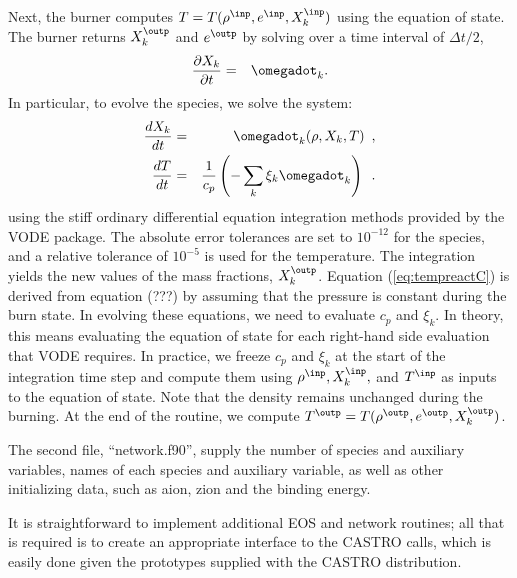 Next, the burner computes $T = T(\rho^\inp,e^\inp,X_k^\inp)$ using the equation of state.
The burner returns $X_k^\outp$ and $e^\outp$ by solving over a time interval of $\Delta t/2$,
\begin{eqnarray}
\frac{\partial X_k}{\partial t} &=& \omegadot_k.\\
\end{eqnarray}
In particular, to evolve the species, we solve the system:
\begin{eqnarray}
\frac{dX_k}{dt} &=& \omegadot_k(\rho,X_k,T)\enskip, \label{eq:VODE1C} \\
\frac{dT}{dt} &=&\frac{1}{c_p} \left ( -\sum_k \xi_k  \omegadot_k  \right )\enskip. \label{eq:tempreactC}
\end{eqnarray}
using the stiff ordinary differential equation integration methods provided by 
the VODE package.  The absolute error tolerances are set to 
$10^{-12}$ for the species, and a relative tolerance of $10^{-5}$ is used for 
the temperature.  The integration yields the new values of the mass fractions, 
$X_k^\outp$.  Equation (\ref{eq:tempreactC}) is derived from equation (???) by 
assuming that the pressure is constant during the burn state.  In evolving these 
equations, we need to evaluate $c_p$ and $\xi_k$.  In theory, this means 
evaluating the equation of state for each right-hand side evaluation that 
VODE requires.  In practice, we freeze $c_p$ and $\xi_k$ at the start of 
the integration time step and compute them using $\rho^\inp, X_k^\inp,$ and $T^\inp$ 
as inputs to the equation of state.  Note that the density remains unchanged during 
the burning.  At the end of the routine, we compute 
$T^\outp = T(\rho^\outp,e^{\outp},X_k^\outp)$.

The second file, ``network.f90'', supply the
number of species and auxiliary variables, names of each species and 
auxiliary variable, as well as other initializing data, such as
aion, zion and the binding energy.

It is straightforward to implement additional EOS and network routines; all that is required
is to create an appropriate interface to the CASTRO calls, which is easily done given
the prototypes supplied with the CASTRO distribution.
